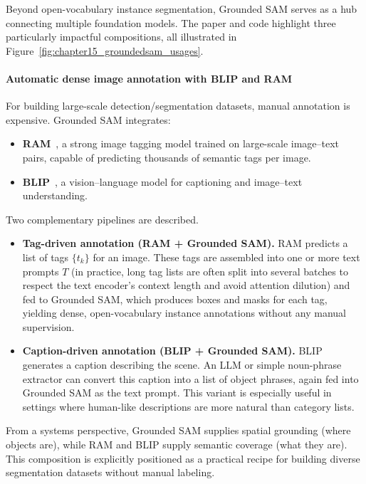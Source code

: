 \begin{enrichment}
\begin{enrichment}
		Beyond open-vocabulary instance segmentation, Grounded SAM serves as a hub connecting multiple foundation models.
		The paper and code highlight three particularly impactful compositions, all illustrated in Figure~\ref{fig:chapter15_groundedsam_usages}.
		
		\paragraph{Automatic dense image annotation with BLIP and RAM}
		For building large-scale detection/segmentation datasets, manual annotation is expensive.
		Grounded SAM integrates:
		
		\begin{itemize}
			\item \textbf{RAM}~\cite{zhang2023_ram}, a strong image tagging model trained on large-scale image–text pairs, capable of predicting thousands of semantic tags per image.
			\item \textbf{BLIP}~\cite{li2022_blip}, a vision–language model for captioning and image–text understanding.
		\end{itemize}
		
		Two complementary pipelines are described.
		
		\begin{itemize}
			\item \textbf{Tag-driven annotation (RAM + Grounded SAM).}
			RAM predicts a list of tags $\{t_k\}$ for an image.
			These tags are assembled into one or more text prompts $T$ (in practice, long tag lists are often split into several batches to respect the text encoder’s context length and avoid attention dilution) and fed to Grounded SAM, which produces boxes and masks for each tag, yielding dense, open-vocabulary instance annotations without any manual supervision.
			\item \textbf{Caption-driven annotation (BLIP + Grounded SAM).}
			BLIP generates a caption describing the scene.
			An LLM or simple noun-phrase extractor can convert this caption into a list of object phrases, again fed into Grounded SAM as the text prompt.
			This variant is especially useful in settings where human-like descriptions are more natural than category lists.
		\end{itemize}
		
		From a systems perspective, Grounded SAM supplies spatial grounding (where objects are), while RAM and BLIP supply semantic coverage (what they are).
		This composition is explicitly positioned as a practical recipe for building diverse segmentation datasets without manual labeling.
		

\end{enrichment}
\end{enrichment}
